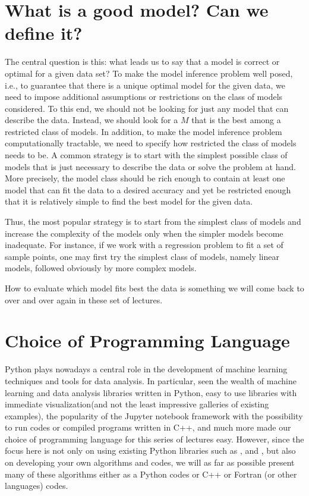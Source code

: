 \documentclass[letterpaper,10pt,english]{sphinxmanual}
\begin{document}
\chapter{What is a good model? Can we define it?}
\label{\detokenize{chapter1:what-is-a-good-model-can-we-define-it}}
The central question is this: what leads us to say that a model is correct or
optimal for a given data set? To make the model inference problem well posed, i.e.,
to guarantee that there is a unique optimal model for the given data, we need to
impose additional assumptions or restrictions on the class of models considered. To
this end, we should not be looking for just any model that can describe the data.
Instead, we should look for a  \(M\) that is the best among a restricted class
of models. In addition, to make the model inference problem computationally
tractable, we need to specify how restricted the class of models needs to be. A
common strategy is to start
with the simplest possible class of models that is just necessary to describe the data
or solve the problem at hand. More precisely, the model class should be rich enough
to contain at least one model that can fit the data to a desired accuracy and yet be
restricted enough that it is relatively simple to find the best model for the given data.

Thus, the most popular strategy is to start from the
simplest class of models and increase the complexity of the models only when the
simpler models become inadequate. For instance, if we work with a regression problem to fit a set of sample points, one
may first try the simplest class of models, namely linear models, followed obviously by more complex models.

How to evaluate which model fits best the data is something we will come back to over and over again in these set of lectures.


\chapter{Choice of Programming Language}
\label{\detokenize{chapter1:choice-of-programming-language}}
Python plays nowadays a central role in the development of machine
learning techniques and tools for data analysis. In particular, seen
the wealth of machine learning and data analysis libraries written in
Python, easy to use libraries with immediate visualization(and not the
least impressive galleries of existing examples), the popularity of the
Jupyter notebook framework with the possibility to run  codes or
compiled programs written in C++, and much more made our choice of
programming language for this series of lectures easy. However,
since the focus here is not only on using existing Python libraries such
as ,  and , but also on developing your own
algorithms and codes, we will as far as possible present many of these
algorithms either as a Python codes or C++ or Fortran (or other languages) codes.
\end{document}
